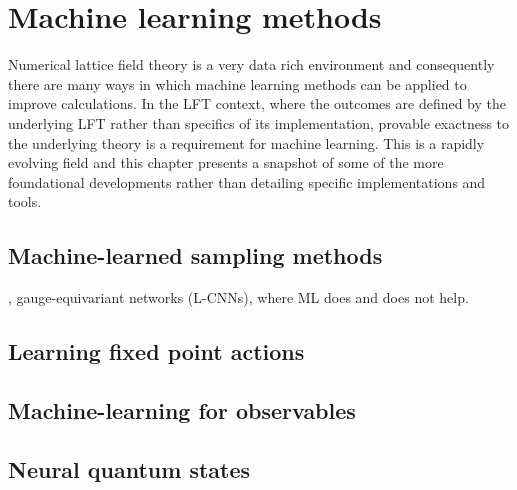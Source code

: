 \chapter{Machine learning methods}
\label{ch:ml-methods}

Numerical lattice field theory is a very data rich environment and consequently there are many ways in which machine learning methods can be applied to improve calculations. In the LFT context, where the outcomes are defined by the underlying LFT rather than specifics of its implementation, provable exactness to the underlying theory is a requirement for machine learning. This is a rapidly evolving field and this chapter presents a snapshot of some of the more foundational developments rather than detailing specific implementations and tools. 

\section{Machine-learned sampling methods}

{, gauge-equivariant networks (L-CNNs), where ML does and does not help.}

\section{Learning fixed point actions}

\section{Machine-learning for observables}

\section{Neural quantum states}